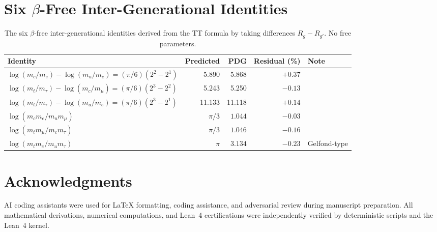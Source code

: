 \documentclass[11pt]{article}
\theoremstyle{remark}
\begin{document}
\section{Six $\beta$-Free Inter-Generational Identities}
\label{app:inter_gen}

\begin{table}[H]
\centering
\caption{The six $\beta$-free inter-generational identities derived from the TT formula
by taking differences $R_g - R_{g'}$.  No free parameters.}
\label{tab:inter_gen}
\small
\begin{tabular}{lrrrl}
\toprule
Identity & Predicted & PDG & Residual (\%) & Note \\
\midrule
$\log(m_c/m_e) - \log(m_u/m_e) = (\pi/6)(2^2-2^1)$ & 5.890 & 5.868 & $+0.37$ & \\
$\log(m_t/m_\tau) - \log(m_c/m_\mu) = (\pi/6)(2^3-2^2)$ & 5.243 & 5.250 & $-0.13$ & \\
$\log(m_t/m_\tau) - \log(m_u/m_e) = (\pi/6)(2^3-2^1)$ & 11.133 & 11.118 & $+0.14$ & \\
$\log(m_c m_e / m_u m_\mu)$ & $\pi/3$ & $1.044$ & $-0.03$ & \\
$\log(m_t m_\mu / m_c m_\tau)$ & $\pi/3$ & $1.046$ & $-0.16$ & \\
$\log(m_t m_e / m_u m_\tau)$ & $\pi$ & $3.134$ & $-0.23$ & Gelfond-type \\
\bottomrule
\end{tabular}
\end{table}





\section*{Acknowledgments}

AI coding assistants were used for LaTeX formatting, coding assistance, and adversarial review during manuscript preparation. All mathematical derivations, numerical computations, and Lean~4 certifications were independently verified by deterministic scripts and the Lean~4 kernel.
\end{document}
